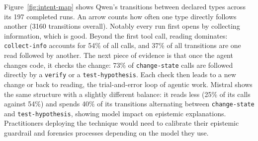 \documentclass{IEEEcsmag}
\begin{document}

Figure~\ref{fig:intent-map} shows Qwen's transitions between declared types across its 197 completed runs. An arrow counts how often one type directly follows another (3160 transitions overall). Notably every run first opens by collecting information, which is good.
Beyond the first tool call, reading dominates: \texttt{collect-info} accounts for 54\% of all calls, and 37\% of all transitions are one read followed by another. 
The next piece of evidence is that once the agent changes code, it checks the change: 73\% of \texttt{change-state} calls are followed directly by a \texttt{verify} or a \texttt{test-hypothesis}.
Each check then leads to a new change or back to reading, the trial-and-error loop of agentic work. 
Mistral shows the same structure with a slightly different balance: it reads less (25\% of its calls against 54\%) and spends 40\% of its transitions alternating between \texttt{change-state} and \texttt{test-hypothesis}, showing model impact on epistemic explanations. Practitioners deploying the technique would need to calibrate their epistemic guardrail and forensics processes depending on the model they use.
\end{document}
